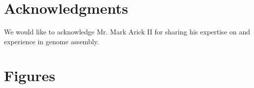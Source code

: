 \documentclass[twocolumn, dvipsnames]{bmcart}%
\begin{document}
\begin{backmatter}
\section*{Acknowledgments}
We would like to acknowledge Mr. Mark Arick II for sharing his expertise on and experience in genome assembly.







\section*{Figures}


\end{backmatter}
\end{document}
